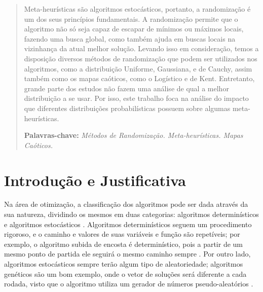 \documentclass[11pt]{article}
\begin{document}
\begin{abstract}

Meta-heurísticas são algoritmos estocásticos, portanto, a randomização é um dos seus princípios fundamentais. A randomização permite que o algoritmo não só seja capaz de escapar de mínimos ou máximos locais, fazendo uma busca global, como também ajuda em buscas locais na vizinhança da atual melhor solução. Levando isso em consideração, temos a disposição diversos métodos de randomização que podem ser utilizados nos algoritmos, como a distribuição Uniforme, Gaussiana, e de Cauchy, assim também como os mapas caóticos, como o Logístico e de Kent. Entretanto, grande parte dos estudos não fazem uma análise de qual a melhor distribuição a se usar. Por isso, este trabalho foca na análise do impacto que diferentes distribuições probabilísticas possuem sobre algumas meta-heurísticas.

\textbf{Palavras-chave:} \textit{Métodos de Randomização. Meta-heurísticas. Mapas Caóticos.}
\end{abstract}

\section{Introdução e Justificativa}
\label{sec:int}


Na área de otimização, a classificação dos algoritmos pode ser dada através da sua natureza, dividindo os mesmos em duas categorias: algoritmos determinísticos e algoritmos estocásticos \cite{yang}. Algoritmos determinísticos seguem um procedimento rigoroso, e o caminho e valores de suas variáveis e função são repetíveis; por exemplo, o algoritmo subida de encosta é determinístico, pois a partir de um mesmo ponto de partida ele seguirá o mesmo caminho sempre \cite{yang}. Por outro lado, algoritmos estocásticos sempre terão algum tipo de aleatoriedade; algoritmos genéticos são um bom exemplo, onde o vetor de soluções será diferente a cada rodada, visto que o algoritmo utiliza um gerador de números pseudo-aleatórios \cite{yang}.
\end{document}
